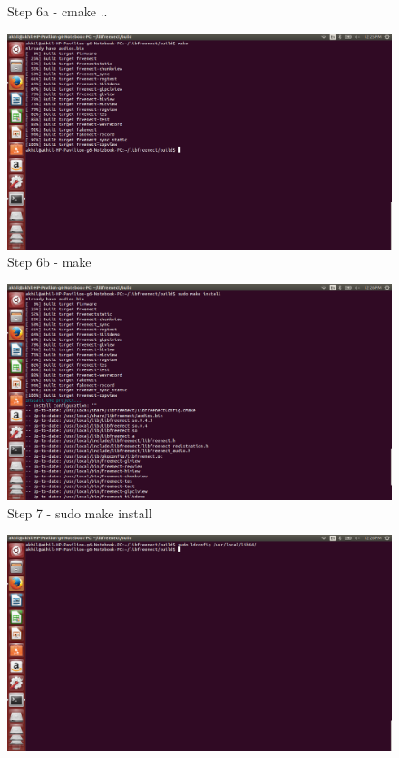 \begin{flushleft}
\begin{figure}
\begin{center}
\end{center}
\caption{Step 6a - cmake ..}
\label{fig:w15}
\end{figure}
\medskip
\begin{figure}
\begin{center}
\includegraphics[scale=0.35]{step7}
\end{center}
\caption{Step 6b - make}
\label{fig:w16}
\end{figure}
\medskip
\begin{figure}
\begin{center}
\includegraphics[scale=0.35]{step8}
\end{center}
\caption{Step 7 - sudo make install}
\label{fig:w17}
\end{figure}
\medskip
\begin{figure}
\begin{center}
\includegraphics[scale=0.35]{step9}

\end{center}
\end{figure}
\end{flushleft}

